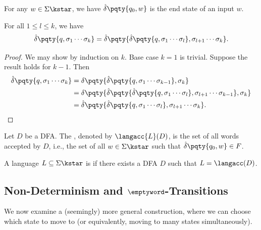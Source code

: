 For any \(w \in \Sigma\kstar\), we have \(\hat{\delta}\pqty{q_0, w}\) is the end state of an input \(w\).

\begin{lemma}
    \label{lem:transitivity-of-extended-transition-function}%
    For all \(1 \leq l \leq k\), we have
    \[
        \hat{\delta}\pqty{q, \sigma_1 \cdots \sigma_k} = \hat{\delta}\pqty{\hat{\delta}\pqty{q, \sigma_1 \cdots \sigma_l}, \sigma_{l + 1} \cdots \sigma_k}.
    \]
\end{lemma}

\begin{proof}
    We may show by induction on \(k\). Base case \(k = 1\) is trivial. Suppose the result holds for \(k - 1\). Then
    \begin{align*}
        \hat{\delta}\pqty{q, \sigma_1 \cdots \sigma_k} &= \delta\pqty{\hat{\delta}\pqty{q, \sigma_1 \cdots \sigma_{k - 1}}, \sigma_k} \\
        &= \delta\pqty{\hat{\delta}\pqty{\hat{\delta}\pqty{q, \sigma_1 \cdots \sigma_l}, \sigma_{l + 1} \cdots \sigma_{k - 1}}, \sigma_k} \\
        &= \hat{\delta}\pqty{\hat{\delta}\pqty{q, \sigma_1 \cdots \sigma_l}, \sigma_{l + 1} \cdots \sigma_k}.
    \end{align*}
\end{proof}

\begin{definition}
    Let \(D\) be a DFA. The , denoted by \(\langacc{L}(D)\), is the set of all words accepted by \(D\), i.e., the set of all \(w \in \Sigma\kstar\) such that \(\hat{\delta}\pqty{q_0, w} \in F\).
    
    A language \(L \subseteq \Sigma\kstar\) is  if there exists a DFA \(D\) such that \(L = \langacc(D)\).
\end{definition}

\subsection{Non-Determinism and \(\emptyword\)-Transitions}

We now examine a (seemingly) more general construction, where we can choose which state to move to (or equivalently, moving to many states simultaneously).

